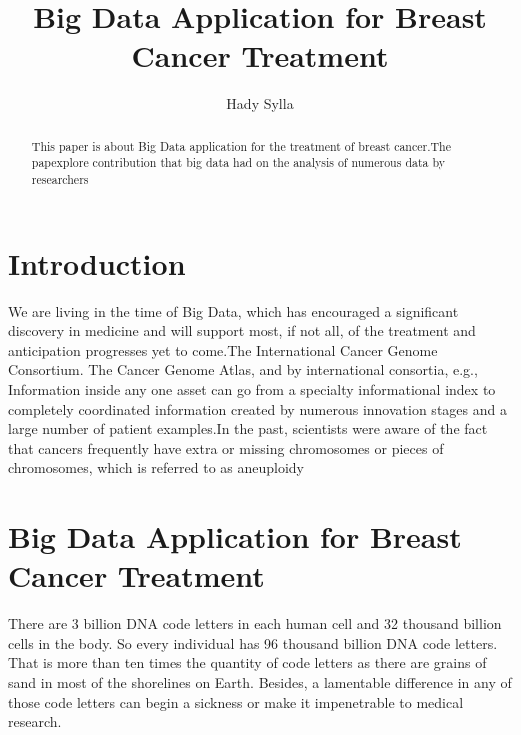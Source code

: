 \documentclass[sigconf]{acmart}
\begin{document}
\title{Big Data Application for Breast Cancer Treatment}


\author{Hady Sylla}


\renewcommand{\shortauthors}{G. v. Laszewski}


\begin{abstract}
This paper is about Big Data application for the treatment of breast cancer.The pap\er explore contribution that big data had on the analysis of numerous data by researchers
\end{abstract}



\maketitle

\section{Introduction}

We are living in the time of Big Data, which has encouraged a significant discovery in medicine and will support most, if not all, of the treatment and anticipation progresses yet to come\cite{murdoch2013inevitable}.The International Cancer Genome Consortium.  The Cancer Genome Atlas, and by international consortia, e.g., Information inside any one asset can go from a specialty informational index to completely coordinated information created by numerous innovation stages and a large number of patient examples\cite{murdoch2013inevitable}.In the past, scientists were aware of the fact that cancers frequently have extra or missing chromosomes or pieces of chromosomes, which is referred to as aneuploidy 

\section{Big Data Application for Breast Cancer Treatment}

\setlength{\parskip}{1em}
\renewcommand{\baselinestretch}{2.0}

There are 3 billion DNA code letters in each human cell and 32 thousand billion cells in the body. So every individual has 96 thousand billion DNA code letters\cite{cavalli1999}. That is more than ten times the quantity of code letters as there are grains of sand in most of the shorelines on Earth. Besides, a lamentable difference in any of those code letters can begin a sickness or make it impenetrable to medical research\cite{cavalli1999}.
\end{document}
